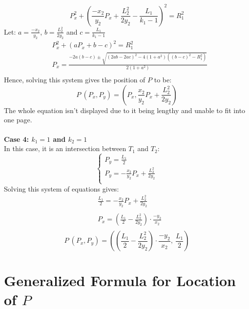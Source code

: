 \documentclass[a4paper,12pt]{article}
\begin{document}
\begin{equation*}
    P_x^2 + \left(\frac{-x_2}{y_2}P_x + \frac{L_2^2}{2y_2} - \frac{L_1}{k_1-1}\right)^2 = R_1^2
\end{equation*}
Let: $a=\frac{-x_2}{y_2}$, $b=\frac{L_2^2}{2y_2}$ and $c=\frac{L_1}{k_1-1}$
\begin{equation*}
    \begin{split}
      &P_x^2 + \left(aP_x + b - c\right)^2 = R_1^2\\
      &P_x=\frac{-2a(b-c) \pm \sqrt{(2ab-2ac)^2 -4(1+a^2)((b-c)^2-R_1^2)}}{2(1+a^2)}\\
    \end{split}
\end{equation*}
Hence, solving this system gives the position of $P$ to be:
\begin{equation}
    P~(P_x, P_y)=\left(P_x,\frac{x_{2}}{y_{2}}P_x+\frac{L_2^2}{2y_{2}}\right)
\label{eq:case3}
\end{equation}
The whole equation isn't displayed due to it being lengthy and unable to fit into one page. 
\\\\
\textbf{Case 4: $k_1=1$ and $k_2=1$ }
\\
In this case, it is an intersection between $T_1$ and $T_2$:
\begin{equation*}
    \begin{cases}
        P_y = \frac{L_1}{2}\\
        P_y=-\frac{x_{2}}{y_{2}}P_x+\frac{L_2^2}{2y_{2}}\\ 
    \end{cases}
\end{equation*}
Solving this system of equations gives:
\begin{equation*}
    \begin{split}
        &\frac{L_1}{2}=-\frac{x_{2}}{y_{2}}P_x+\frac{L_2^2}{2y_{2}}\\\\
        &P_x = \left(\frac{L_1}{2}-\frac{L_2^2}{2y_{2}}\right)\cdot \frac{-y_{2}}{x_{2}}\\
    \end{split}
\end{equation*}
\begin{equation}
    P~(P_x, P_y)=\left(\left(\frac{L_1}{2}-\frac{L_2^2}{2y_{2}}\right)\cdot \frac{-y_{2}}{x_{2}},~\frac{L_1}{2}\right)
\label{eq:case4}
\end{equation}

\section{Generalized Formula for Location of $P$}
\end{document}
